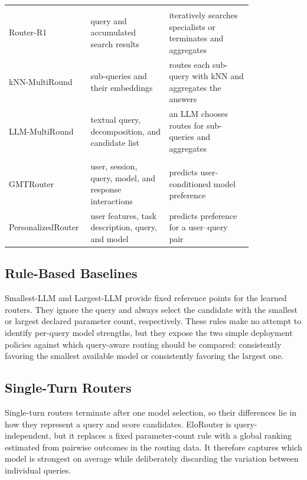 \begin{table}[t]
\begin{tabular}{
    p{0.20\linewidth}
    p{0.30\linewidth}
    p{0.32\linewidth}
}
\midrule
\rowcolor{barGray} \multicolumn{3}{c}{\textit{Multi-turn routers}} \\
Router-R1
& query and accumulated search results
& iteratively searches specialists or terminates and aggregates \\
\routerspace
kNN-MultiRound
& sub-queries and their embeddings
& routes each sub-query with kNN and aggregates the answers \\
\routerspace
LLM-MultiRound
& textual query, decomposition, and candidate list
& an LLM chooses routes for sub-queries and aggregates \\
\midrule
\rowcolor{barGray} \multicolumn{3}{c}{\textit{Personalized routers}} \\
GMTRouter
& user, session, query, model, and response interactions
& predicts user-conditioned model preference \\
\routerspace
PersonalizedRouter
& user features, task description, query, and model
& predicts preference for a user--query pair \\
\bottomrule
\end{tabular}
\end{table}


\subsection{Rule-Based Baselines}

Smallest-LLM and Largest-LLM provide fixed reference points for the learned routers. They ignore the query and always select the candidate with the smallest or largest declared parameter count, respectively. These rules make no attempt to identify per-query model strengths, but they expose the two simple deployment policies against which query-aware routing should be compared: consistently favoring the smallest available model or consistently favoring the largest one.

\subsection{Single-Turn Routers}

Single-turn routers terminate after one model selection, so their differences lie in how they represent a query and score candidates. EloRouter is query-independent, but it replaces a fixed parameter-count rule with a global ranking estimated from pairwise outcomes in the routing data. It therefore captures which model is strongest on average while deliberately discarding the variation between individual queries.

